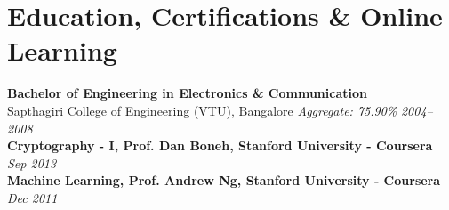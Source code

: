 \documentclass[11pt]{article}
\begin{document}


\section*{Education, Certifications \& Online Learning}

\textbf{Bachelor of Engineering in Electronics \& Communication} \\
Sapthagiri College of Engineering (VTU), Bangalore \hfill \textit{Aggregate: 75.90\%} \textit{2004–2008}  \\

\vspace{0.5em}
\textbf{Cryptography - I, Prof. Dan Boneh, Stanford University - Coursera} \hfill \textit{Sep 2013} \\

\textbf{Machine Learning, Prof. Andrew Ng, Stanford University - Coursera} \hfill \textit{Dec 2011} \\
\end{document}
